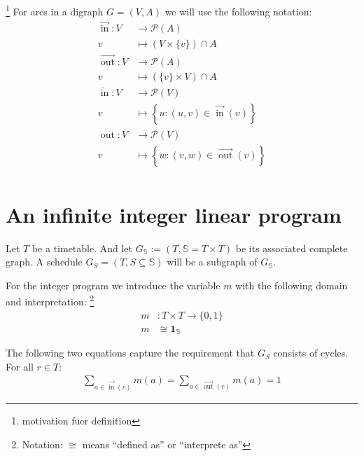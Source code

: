 \documentclass[a4paper]{amsart} %
\newcommand{\todo}[1]{\footnote{#1}}
\DeclareMathOperator{\In}{in}
\DeclareMathOperator{\Out}{out}
\newcommand{\ina}{\ensuremath{\vec{\In}}}
\newcommand{\outa}{\ensuremath{\vec{\Out}}}
\newcommand{\inv}{\ensuremath{\dot{\In}}}
\newcommand{\outv}{\ensuremath{\dot{\Out}}}
\begin{document}
\todo{motivation fuer definition}
For arcs in a digraph \(G=(V,A)\) we will use the following notation:
\begin{align*}
\ina\colon  V &\to \mathcal{P}(A) \\
v &\mapsto \left(V \times \{v\}\right) \cap A\\
\outa\colon  V &\to \mathcal{P}(A) \\
v &\mapsto \left(\{v\} \times V\right) \cap A\\
\inv\colon  V &\to \mathcal{P}(V) \\
v &\mapsto \left\{ u \colon \left(u,v\right) \in \ina(v) \right\}\\
\outv\colon  V &\to \mathcal{P}(V) \\
v &\mapsto \left\{w \colon \left(v,w\right) \in \outa\left(v\right) \right\}\\
\end{align*}

\section{An infinite integer linear program}

Let \(T\) be a timetable.  And let \(G_\mathbb{S} := (T, \mathbb{S} =
T \times T) \) be its associated complete graph.  A schedule \(G_S = (T, S \subseteq \mathbb{S})\)
will be a subgraph of \(G_\mathbb{S}\).


For the integer program we introduce the variable \(m\) with the following domain and interpretation:
\todo{Notation: \(\cong\) means ``defined as'' or ``interprete as''}
\begin{align}
  m & \colon T \times T \to \{0,1\} \\
  m & \cong \mathbf{1}_{\mathbb{S}}
\end{align}


The following two equations capture the requirement that \(G_S\) consists of cycles.  For all \(r \in T\):
\begin{align}
  \label{matchBedingung}
  \sum_{a \in \ina(r)}  m(a) = \sum_{a \in \outa(r)} m(a) = 1
\end{align}
\end{document}
